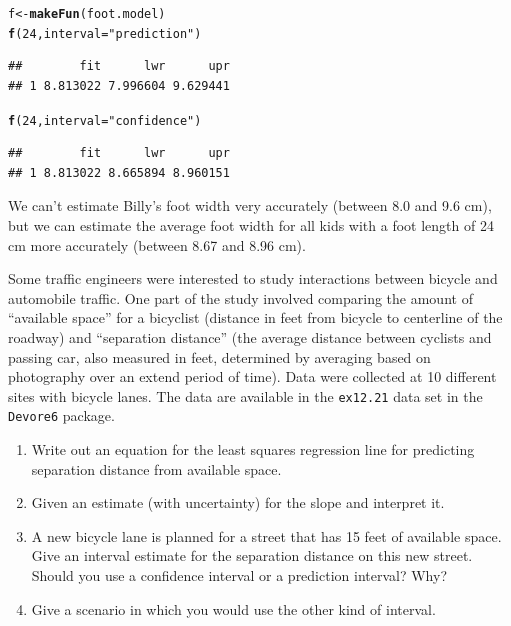 \documentclass[twoside]{book}\usepackage[]{graphicx}\usepackage[]{xcolor}
\makeatletter
\newcommand{\hlnum}[1]{\textcolor[rgb]{0.686,0.059,0.569}{#1}}%
\newcommand{\hlstr}[1]{\textcolor[rgb]{0.192,0.494,0.8}{#1}}%
\newcommand{\hlstd}[1]{\textcolor[rgb]{0.345,0.345,0.345}{#1}}%
\newcommand{\hlkwb}[1]{\textcolor[rgb]{0.69,0.353,0.396}{#1}}%
\newcommand{\hlkwc}[1]{\textcolor[rgb]{0.333,0.667,0.333}{#1}}%
\newcommand{\hlkwd}[1]{\textcolor[rgb]{0.737,0.353,0.396}{\textbf{#1}}}%
\newenvironment{kframe}{%
 \def\at@end@of@kframe{}%
 \ifinner\ifhmode%
  \def\at@end@of@kframe{\end{minipage}}%
  \begin{minipage}{\columnwidth}%
 \fi\fi%
 \def\FrameCommand##1{\hskip\@totalleftmargin \hskip-\fboxsep
 \colorbox{shadecolor}{##1}\hskip-\fboxsep
     \hskip-\linewidth \hskip-\@totalleftmargin \hskip\columnwidth}%
 \MakeFramed {\advance\hsize-\width
   \@totalleftmargin\z@ \linewidth\hsize
   \@setminipage}}%
 {\par\unskip\endMakeFramed%
 \at@end@of@kframe}
\newenvironment{knitrout}{}{} %
\newcommand{\Rindex}[1]{\index{\texttt{#1}}}
\newcommand{\dataframe}[1]{{\color{blue!80!black}\texttt{#1}}\Rindex{#1}}
\newcommand{\pkg}[1]{{\color{red!80!black}\texttt{#1}}\Rindex{#1}}
\makeatother
\begin{document}
\begin{solution}
\begin{knitrout}
\color{fgcolor}\begin{kframe}
\begin{alltt}
\hlstd{f} \hlkwb{<-} \hlkwd{makeFun}\hlstd{(foot.model)}
\hlkwd{f}\hlstd{(}\hlnum{24}\hlstd{,} \hlkwc{interval} \hlstd{=} \hlstr{"prediction"}\hlstd{)}
\end{alltt}
\begin{verbatim}
##        fit      lwr      upr
## 1 8.813022 7.996604 9.629441
\end{verbatim}
\begin{alltt}
\hlkwd{f}\hlstd{(}\hlnum{24}\hlstd{,} \hlkwc{interval} \hlstd{=} \hlstr{"confidence"}\hlstd{)}
\end{alltt}
\begin{verbatim}
##        fit      lwr      upr
## 1 8.813022 8.665894 8.960151
\end{verbatim}
\end{kframe}
\end{knitrout}
We can't estimate Billy's foot width very accurately (between 8.0 and 9.6 cm),
but we can estimate the average foot width for all kids with a foot length of
24 cm more accurately (between 8.67 and 8.96 cm).
\end{solution}

\begin{problem}
	Some traffic engineers were interested to study interactions between bicycle and 
	automobile traffic.  One part of the study involved comparing the amount of 
	``available space'' for a bicyclist 
	(distance in feet from bicycle to centerline of the roadway) and 
	``separation distance'' 
	(the average distance between cyclists and passing car, also measured in feet, 
	determined by averaging based on photography over an extend period of time).
	Data were collected at 10 different sites with bicycle lanes.
	The data are available in the \dataframe{ex12.21} data set in 
	the \pkg{Devore6} package.

	\begin{enumerate}
		\item Write out an equation for the least squares regression line for 
			predicting separation distance from available space.
		\item Given an estimate (with uncertainty) for the slope and interpret it.
		\item A new bicycle lane is planned for a street that has 15 feet of available
			space.  Give an interval estimate for the separation distance 
			on this new street.  Should you use a confidence interval or a prediction
			interval?  Why?
		\item
			Give a scenario in which you would use the other kind of interval.
	\end{enumerate}
\end{problem}
\end{document}
